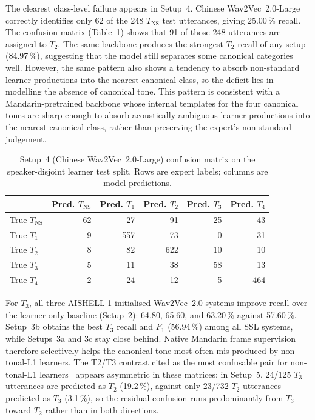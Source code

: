 The clearest class-level failure appears in Setup~4. Chinese Wav2Vec~2.0-Large
correctly identifies only 62 of the 248 \(T_{\mathrm{NS}}\) test utterances,
giving 25.00\,\% recall. The confusion matrix
(Table~\ref{tab:exp:cm_w2v_chinese}) shows that 91 of those 248 utterances are
assigned to \(T_2\). The same backbone produces the strongest \(T_2\) recall
of any setup (84.97\,\%), suggesting that the model still separates some
canonical categories well. However, the same pattern also shows a tendency to
absorb non-standard learner productions into the nearest canonical class, so the
deficit lies in modelling the absence of canonical tone. This pattern is
consistent with a Mandarin-pretrained backbone whose
internal templates for the four canonical tones are sharp enough to absorb
acoustically ambiguous learner productions into the nearest canonical class,
rather than preserving the expert's non-standard judgement.

\begin{table}[H]
\centering
\caption{Setup~4 (Chinese Wav2Vec~2.0-Large) confusion matrix on the
speaker-disjoint learner test split. Rows are expert labels; columns are
model predictions.}
\label{tab:exp:cm_w2v_chinese}
\small
\begin{tabular}{@{}lrrrrr@{}}
\toprule
 & \textbf{Pred. \(T_{\mathrm{NS}}\)} & \textbf{Pred. \(T_1\)} & \textbf{Pred. \(T_2\)} & \textbf{Pred. \(T_3\)} & \textbf{Pred. \(T_4\)} \\
\midrule
True \(T_{\mathrm{NS}}\) & 62 & 27 & 91 & 25 & 43 \\
True \(T_1\)             &  9 & 557 & 73 &  0 & 31 \\
True \(T_2\)             &  8 & 82 & 622 & 10 & 10 \\
True \(T_3\)             &  5 & 11 & 38 & 58 & 13 \\
True \(T_4\)             &  2 & 24 & 12 &  5 & 464 \\
\bottomrule
\end{tabular}
\end{table}

For \(T_3\), all three AISHELL-1-initialised Wav2Vec~2.0 systems improve recall
over the learner-only baseline (Setup~2): 64.80, 65.60, and 63.20\,\% against
57.60\,\%. Setup~3b obtains the best \(T_3\) recall and \(F_1\) (56.94\,\%)
among all SSL systems, while Setups~3a and 3c stay close behind. Native Mandarin
frame supervision therefore selectively helps the canonical tone most often
mis-produced by non-tonal-L1 learners. The T2/T3 contrast cited as the most
confusable pair for non-tonal-L1 learners~\cite{hao2012} appears asymmetric in
these matrices: in Setup~5, 24/125 \(T_3\) utterances are predicted as \(T_2\)
(19.2\,\%), against only 23/732 \(T_2\) utterances predicted as \(T_3\)
(3.1\,\%), so the residual confusion runs predominantly from \(T_3\) toward
\(T_2\) rather than in both directions.

